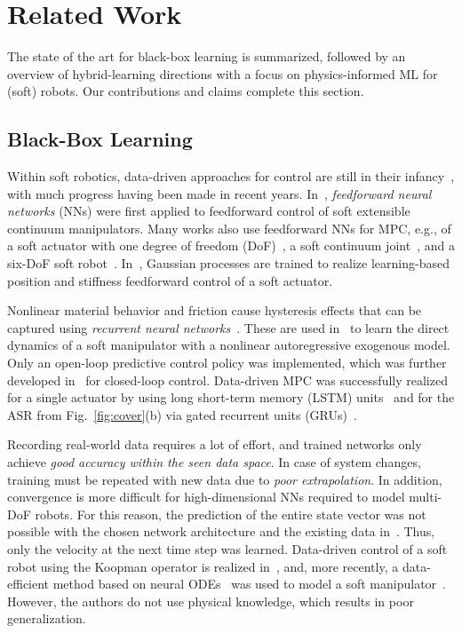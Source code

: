 \section{Related Work}
\label{relatedwork}
The state of the art for black-box learning is summarized, followed by an overview of hybrid-learning directions with a focus on physics-informed ML for (soft) robots. 
Our contributions and claims complete this section.
\subsection{Black-Box Learning}
Within soft robotics, data-driven approaches for control are still in their infancy~\cite{Wang.2021b}, with much progress having been made in recent years. 
In~\cite{Braganza.2007}, \textit{feedforward neural networks} (NNs) were first applied to feedforward control of soft extensible continuum manipulators. 
Many works also use feedforward NNs for MPC, e.g., of a soft actuator with one degree of freedom (DoF)~\cite{Gillespie.2018}, a soft continuum joint~\cite{Cheney.2024}, and a six-DoF soft robot~\cite{Hyatt.2019,Hyatt.2020}.
In~\cite{Habich.2023}, Gaussian processes are trained to realize learning-based position and stiffness feedforward control of a soft actuator.

Nonlinear material behavior and friction cause hysteresis effects that can be captured using \textit{recurrent neural networks}~\cite{Lipton.29.05.2015}. 
These are used in~\cite{Thuruthel.2017} to learn the direct dynamics of a soft manipulator with a nonlinear autoregressive exogenous model. 
Only an open-loop predictive control policy was implemented, which was further developed in~\cite{Thuruthel.2019} for closed-loop control.
Data-driven MPC was successfully realized for a single actuator by using long short-term memory (LSTM) units~\cite{Luong.2021} and for the ASR from Fig.~\ref{fig:cover}(b) via gated recurrent units (GRUs)~\cite{Schafke.2024}.

Recording real-world data requires a lot of effort, and trained networks only achieve \textit{good accuracy within the seen data space}.
In case of system changes, training must be repeated with new data due to\textit{ poor extrapolation}. 
In addition, convergence is more difficult for high-dimensional NNs required to model multi-DoF robots. 
For this reason, the prediction of the entire state vector was not possible with the chosen network architecture and the existing data in~\cite{Hyatt.2019}.
Thus, only the velocity at the next time step was learned. 
Data-driven control of a soft robot using the Koopman operator is realized in~\cite{Bruder.2021}, and, more recently, a data-efficient method based on neural ODEs~\cite{Chen.2018} was used to model a soft manipulator~\cite{Kasaei.2023}. 
However, the authors do not use physical knowledge, which results in poor generalization.

